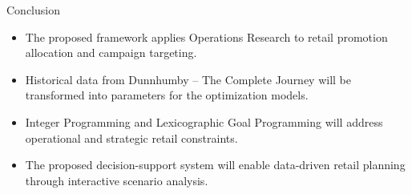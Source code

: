 \documentclass[aspectratio=169,10pt]{beamer}
\begin{document}
\begin{frame}{Conclusion}

\vspace{0.35cm}

\begin{itemize}

    \item The proposed framework applies Operations Research to
    retail promotion allocation and campaign targeting.

    \vspace{0.35cm}

    \item Historical data from Dunnhumby -- The Complete Journey
    will be transformed into parameters for the optimization models.

    \vspace{0.35cm}

    \item Integer Programming and Lexicographic Goal Programming
    will address operational and strategic retail constraints.

    \vspace{0.35cm}

    \item The proposed decision-support system will enable
    data-driven retail planning through interactive scenario analysis.

\end{itemize}

\end{frame}
\end{document}
